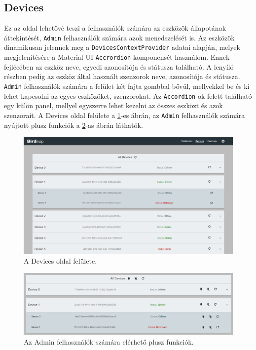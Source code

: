 \subsection{Devices}
Ez az oldal lehetővé teszi a felhasználók számára az eszközök állapotának áttekintését, \verb+Admin+ felhasználók számára azok menedszelését is.
Az eszközök dinamikusan jelennek meg a \verb+DevicesContextProvider+ adatai alapján, melyek megjelenítésére a Material UI \verb+Accrordion+ komponensét használom.
Ennek fejlécében az eszköz neve, egyedi azonosítója és státusza található. A lenyíló részben pedig az eszköz által használt szenzorok neve, azonosítója és státusza.
\verb+Admin+ felhasználók számára a felület két fajta gombbal bővül, mellyekkel be és ki lehet kapcsolni az egyes eszközöket, szenzorokat.
Az \verb+Accordion+-ok felett található egy külön panel, mellyel egyszerre lehet kezelni az összes eszközt és azok szenzorait.
A Devices oldal felülete a \ref{fig:frontend-devices}-es ábrán,
az \verb+Admin+ felhasználók számára nyújtott plusz funkciók a \ref{fig:frontend-devices-admin}-as ábrán láthatók.
\begin{figure}[!ht]
    \centering
    \includegraphics[width=150mm, keepaspectratio]{figures/devices.png}
    \caption{A Devices oldal felülete.}
    \label{fig:frontend-devices}
\end{figure}
\begin{figure}[!ht]
    \centering
    \includegraphics[width=150mm, keepaspectratio]{figures/devices-admin.png}
    \caption{Az Admin felhasználók számára elérhető plusz funkciók.}
    \label{fig:frontend-devices-admin}
\end{figure}
